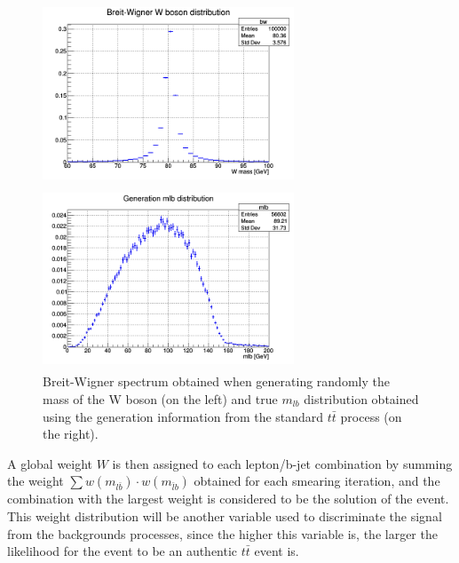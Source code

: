 \documentclass[a4paper, 10pt, openright]{report}
\begin{document}
\begin{figure}[htbp]
\centering
\begin{minipage}[b]{.48\textwidth}
\includegraphics[width=7.5cm, height=5.4cm]{figs/bw.png}
\end{minipage}\hfill
\begin{minipage}[b]{.48\textwidth}
\includegraphics[width=7.5cm, height=5.4cm]{figs/mlb.png}
\end{minipage} \hfill
\caption{Breit-Wigner spectrum obtained when generating randomly the mass of the W boson (on the left) and true $m_{lb}$ distribution obtained using the generation information from the standard $t \bar t$ process (on the right).}
\label{fig:truemlb}
\end{figure}

A global weight $W$ is then assigned to each lepton/b-jet combination by summing the weight $\sum w(m_{l \bar b}) \cdot w(m_{\bar l b})$ obtained for each smearing iteration, and the combination with the largest weight is considered to be the solution of the event. This weight distribution will be another variable used to discriminate the signal from the backgrounds processes, since the higher this variable is, the larger the likelihood for the event to be an authentic $t \bar t$ event is.
\end{document}

